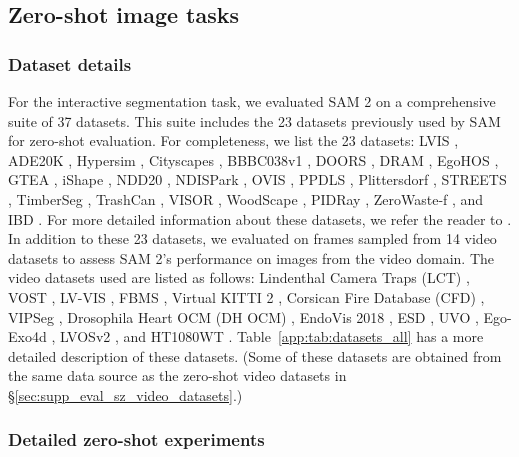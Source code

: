 \documentclass[]{fairmeta}
\newcommand{\secref}[1]{\S\ref{#1}}
\newcommand{\tabref}[1]{Table~\ref{#1}}
\begin{document}
\subsection{Zero-shot image tasks}
\label{app:sam_zs}

\subsubsection{Dataset details} 

For the interactive segmentation task, we evaluated SAM 2 on a comprehensive suite of 37 datasets. This suite includes the 23 datasets previously used by SAM for zero-shot evaluation. For completeness, we list the 23 datasets: 
LVIS \citep{Gupta2019},
ADE20K \citep{Zhou2019},
Hypersim \citep{hypersim},
Cityscapes \citep{cordts2016cityscapes},
BBBC038v1 \citep{cells},
DOORS \citep{doors},
DRAM \citep{DRAM},
EgoHOS \citep{egoHos},
GTEA \citep{gtea1,gtea2},
iShape \citep{iShape},
NDD20 \citep{ndd20},
NDISPark \citep{ndis1,ndis2},
OVIS \citep{qi2022occluded},
PPDLS \citep{plants},
Plittersdorf \citep{haucke2022socrates},
STREETS \citep{streets},
TimberSeg \citep{timberSeg},
TrashCan \citep{hong2020trashcan},
VISOR \citep{darkhalil2022epic,EpicKitchens},
WoodScape \citep{yogamani2019woodscape},
PIDRay \citep{wang2021towards},
ZeroWaste-f \citep{zerowaste}, and
IBD \citep{chen20223D}. For more detailed information about these datasets, we refer the reader to \citet{kirillov2023segment}. In addition to these 23 datasets, we evaluated on frames sampled from 14 video datasets to assess SAM 2's performance on images from the video domain. The video datasets used are listed as follows: 
Lindenthal Camera Traps (LCT) \citep{haucke2021exploiting},
VOST \citep{Tokmakov2022BreakingT},
LV-VIS \citep{wang2023towards},
FBMS \citep{brox2010freiburg},
Virtual KITTI 2 \citep{cabon2020virtual},
Corsican Fire Database (CFD) \citep{toulouse2017computer},
VIPSeg \citep{miao2022large},
Drosophila Heart OCM (DH OCM) \citep{fishman2023drosophila},
EndoVis 2018 \citep{allan20202018},
ESD \citep{huang2023neuromorphic},
UVO \citep{wang2021unidentified},
Ego-Exo4d \citep{grauman2023ego},
LVOSv2 \citep{hong2024lvos}, and
HT1080WT \citep{gomez2021search}. \tabref{app:tab:datasets_all} has a more detailed description of these datasets. (Some of these datasets are obtained from the same data source as the zero-shot video datasets in \secref{sec:supp_eval_sz_video_datasets}.)

\subsubsection{Detailed zero-shot experiments}
\label{app:sam_zs_detailed}
\end{document}
